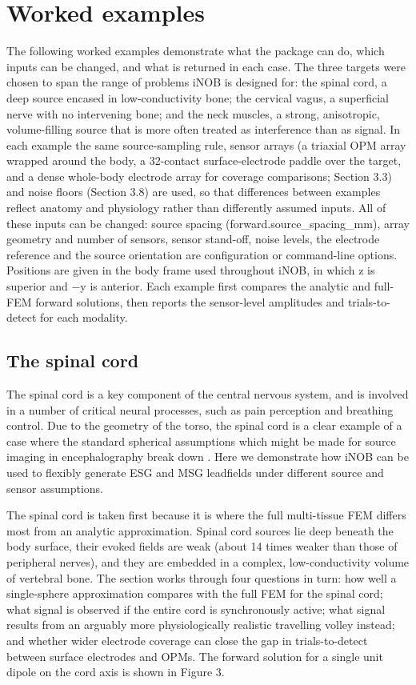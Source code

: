 \documentclass[11pt]{article}
\begin{document}
\section{Worked examples}\label{worked-examples}

The following worked examples demonstrate what the package can do, which
inputs can be changed, and what is returned in each case. The three
targets were chosen to span the range of problems iNOB is designed for:
the spinal cord, a deep source encased in low-conductivity bone; the
cervical vagus, a superficial nerve with no intervening bone; and the
neck muscles, a strong, anisotropic, volume-filling source that is more
often treated as interference than as signal. In each example the same
source-sampling rule, sensor arrays (a triaxial OPM array wrapped around
the body, a 32-contact surface-electrode paddle over the target, and a
dense whole-body electrode array for coverage comparisons; Section 3.3)
and noise floors (Section 3.8) are used, so that differences between
examples reflect anatomy and physiology rather than differently assumed
inputs. All of these inputs can be changed: source spacing
(forward.source\_spacing\_mm), array geometry and number of sensors,
sensor stand-off, noise levels, the electrode reference and the source
orientation are configuration or command-line options. Positions are
given in the body frame used throughout iNOB, in which z is superior and
−y is anterior. Each example first compares the analytic and full-FEM
forward solutions, then reports the sensor-level amplitudes and
trials-to-detect for each modality.

\subsection{The spinal cord}\label{the-spinal-cord}

The spinal cord is a key component of the central nervous system, and is
involved in a number of critical neural processes, such as pain
perception and breathing control. Due to the geometry of the torso, the
spinal cord is a clear example of a case where the standard spherical
assumptions which might be made for source imaging in encephalography
break down \citep{233}. Here we demonstrate how iNOB can be
used to flexibly generate ESG and MSG leadfields under different source
and sensor assumptions.

The spinal cord is taken first because it is where the full multi-tissue
FEM differs most from an analytic approximation. Spinal cord sources lie
deep beneath the body surface, their evoked fields are weak (about 14
times weaker than those of peripheral nerves), and they are embedded in
a complex, low-conductivity volume of vertebral bone. The section works
through four questions in turn: how well a single-sphere approximation
compares with the full FEM for the spinal cord; what signal is observed
if the entire cord is synchronously active; what signal results from an
arguably more physiologically realistic travelling
volley instead; and whether wider electrode coverage can close the gap
in trials-to-detect between surface electrodes and OPMs. The forward
solution for a single unit dipole on the cord axis is shown in Figure 3.
\end{document}
